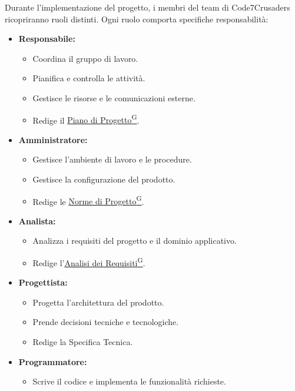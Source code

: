 Durante l'implementazione del progetto, i membri del team di Code7Crusaders ricopriranno ruoli distinti. Ogni ruolo comporta specifiche responsabilità:
\begin{itemize}
    \item \textbf{Responsabile:}
    \begin{itemize}
        \item Coordina il gruppo di lavoro.
        \item Pianifica e controlla le attività.
        \item Gestisce le risorse e le comunicazioni esterne.
        \item Redige il \href{https://code7crusaders.github.io/docs/PB/documentazione_interna/glossario.html#piano-di-progetto}{Piano di Progetto\textsuperscript{G}}.
    \end{itemize}
    \item \textbf{Amministratore:}
    \begin{itemize}
        \item Gestisce l’ambiente di lavoro e le procedure.
        \item Gestisce la configurazione del prodotto.
        \item Redige le \href{https://code7crusaders.github.io/docs/PB/documentazione_interna/glossario.html#norme-di-progetto}{Norme di Progetto\textsuperscript{G}}.
    \end{itemize}
    \item \textbf{Analista:}
    \begin{itemize}
        \item Analizza i requisiti del progetto e il dominio applicativo.
        \item Redige l’\href{https://code7crusaders.github.io/docs/PB/documentazione_interna/glossario.html#analisi-dei-requisiti}{Analisi dei Requisiti\textsuperscript{G}}.
    \end{itemize}
    \item \textbf{Progettista:}
    \begin{itemize}
        \item Progetta l’architettura del prodotto.
        \item Prende decisioni tecniche e tecnologiche.
        \item Redige la Specifica Tecnica.
    \end{itemize}
    \item \textbf{Programmatore:}
    \begin{itemize}
        \item Scrive il codice e implementa le funzionalità richieste.

\end{itemize}
\end{itemize}
